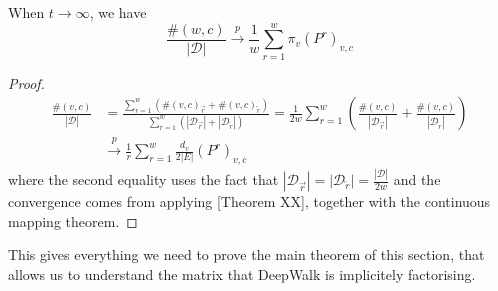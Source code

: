 \documentclass[a4paper]{article}
\newcommand{\D}{\mathcal D}
\newcommand{\rar}{\overrightarrow r}
\newcommand{\lar}{\overleftarrow r}
\begin{document}
\begin{lemma}
  When $t \to \infty$, we have
  \[\frac{\#(w, c)}{|\D|} \overset{p}{\to} \frac{1}{w} \sum_{r = 1}^w \pi_v
    (P^r)_{v,c}\]
\end{lemma}
\begin{proof}
  \begin{align}
    \frac{\#(v, c)}{|\D|} &=  \frac{\sum_{r=1}^w (\#(v, c)_{\rar} + \#(v, c)_{\lar})}{\sum_{r=1}^w (|\D_{\rar}| + |\D_{\lar}|)} = \frac{1}{2w} \sum_{r=1}^w \left( \frac{\#(v, c)}{|\D_{\rar}|} + \frac{\#(v, c)}{|\D_{\lar}|} \right)\\
                          &\overset{p}{\to} \frac{1}{r}\sum_{r=1}^{w} \frac{d_v}{2|E|}(P^r)_{v, c}
  \end{align}
  where the second equality uses the fact that $|\D_{\rar}| = |\D_{\lar}| =
  \frac{|\D|}{2w}$ and the convergence comes from applying [Theorem XX],
  together with the continuous mapping theorem.
\end{proof}

This gives everything we need to prove the main theorem of this section, that
allows us to understand the matrix that DeepWalk is implicitely factorising.

\MainDeepWalk*
\end{document}
